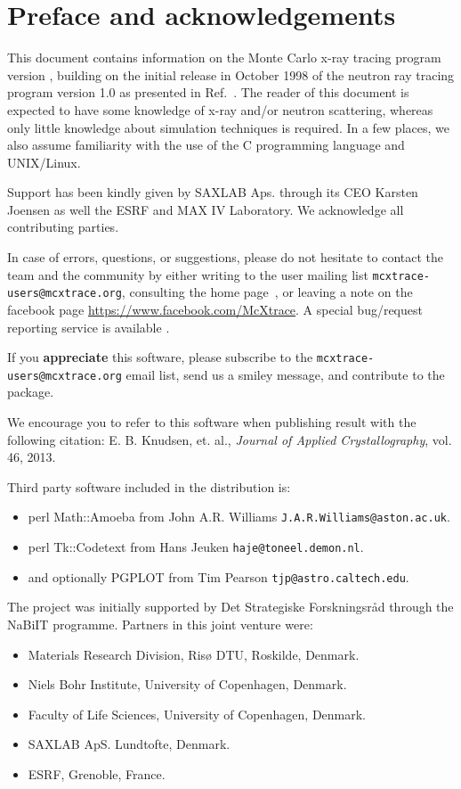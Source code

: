 
\chapter*{Preface and acknowledgements}
This document contains information on the Monte Carlo
x-ray tracing program \MCX version \version, building on the initial
release in October 1998 of the neutron ray tracing program \MCS version 1.0 as presented in Ref.~\cite{nn_10_20}. The reader of this
document is expected to have some knowledge of x-ray and/or neutron scattering,
whereas only little knowledge about simulation techniques is
required. In a few places, we also assume familiarity with the
use of the C programming language and UNIX/Linux.

Support has been kindly given by SAXLAB Aps. through its CEO Karsten Joensen as well 
the ESRF and MAX IV Laboratory. We acknowledge all contributing parties. 

In case of errors, questions, or suggestions, please do not hesitate to
contact the team and the community by either writing to the user mailing list \verb+mcxtrace-users@mcxtrace.org+, 
consulting the \MCX home page~\cite{mcxtrace_webpage}, or leaving a note on the \MCX facebook page \url{https://www.facebook.com/McXtrace}.
A special bug/request reporting service is available \cite{mczilla_webpage}.

If you {\bfseries appreciate} this software, please subscribe to the \verb+mcxtrace-users@mcxtrace.org+ email list, send us a smiley message, and contribute to the package. 

We encourage you to refer to this software when publishing result with the following citation:
E. B. Knudsen, et. al., \textit{Journal of Applied Crystallography}, vol. 46, 2013.

Third party software included in  the distribution \MCX is:
\begin{itemize}
\item perl Math::Amoeba from John A.R. Williams \verb+J.A.R.Williams@aston.ac.uk+.
\item perl Tk::Codetext from Hans Jeuken \verb+haje@toneel.demon.nl+.
\item and optionally PGPLOT from Tim Pearson \verb+tjp@astro.caltech.edu+.
\end{itemize}

The \MCX project was initially supported by Det Strategiske Forskningsråd through the NaBiIT programme. Partners in this joint venture were: 
\begin{itemize}
\item Materials Research Division, Risø DTU, Roskilde, Denmark.
\item Niels Bohr Institute, University of Copenhagen, Denmark.
\item Faculty of Life Sciences, University of Copenhagen, Denmark.
\item SAXLAB ApS. Lundtofte, Denmark.
\item ESRF, Grenoble, France.
\end{itemize}
